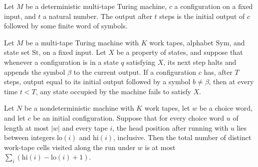 \begin{lemma}
\label{Complexity.LogProg.runFrom_output_extends}
\leanok
{}
Let $M$ be a deterministic multi-tape Turing machine, $c$ a configuration on a fixed
input, and $t$ a natural number. The output after $t$ steps is the initial output of $c$
followed by some finite word of symbols.
\end{lemma}

\begin{lemma}
\label{Complexity.LogProg.avoid_of_halt}
\leanok
{}
Let $M$ be a multi-tape Turing machine with $K$ work tapes, alphabet $\mathrm{Sym}$, and
state set $\mathrm{St}$, on a fixed input. Let $X$ be a property of states, and suppose
that whenever a configuration is in a state $q$ satisfying $X$, its next step halts and
appends the symbol $\beta$ to the current output. If a configuration $c$ has, after $T$
steps, output equal to its initial output followed by a symbol $b\ne\beta$, then at
every time $t<T$, any state occupied by the machine fails to satisfy $X$.
\end{lemma}

\begin{lemma}
\label{Complexity.LogProg.spaceUsedWith_le_of_ranges}
\leanok
{}
Let $N$ be a nondeterministic machine with $K$ work tapes, let $w$ be a choice word, and
let $c$ be an initial configuration. Suppose that for every choice word $u$ of length at
most $|w|$ and every tape $i$, the head position after running with $u$ lies between
integers $\mathrm{lo}(i)$ and $\mathrm{hi}(i)$, inclusive. Then the total number of
distinct work-tape cells visited along the run under $w$ is at most $\sum_i
(\mathrm{hi}(i)-\mathrm{lo}(i)+1)$.
\end{lemma}


